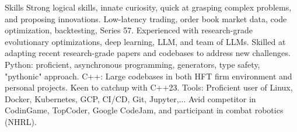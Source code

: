 \begin{rubric}{Skills}
\entry*[]%
Strong logical skills, innate curiosity, quick at grasping complex problems, and proposing innovations.
\entry*[]%
Low-latency trading, order book market data, code optimization, backtesting, Series 57.
\entry*[]%
Experienced with research-grade evolutionary optimizations, deep learning, LLM, and team of LLMs.
\entry*[]%
Skilled at adapting recent research-grade papers and codebases to address new challenges.
%
%
\entry*[]%
Python:  proficient, asynchronous programming, generators, type safety, "pythonic" approach.
\entry*[]%
C++: Large codebases in both HFT firm environment and personal projects. Keen to catchup with C++23.
\entry*[]%
Tools: Proficient user of Linux, Docker, Kubernetes, GCP, CI/CD, Git, Jupyter,...
\entry*[]%
Avid competitor in CodinGame, TopCoder, Google CodeJam, and participant in combat robotics (NHRL).
%
%
\end{rubric}
